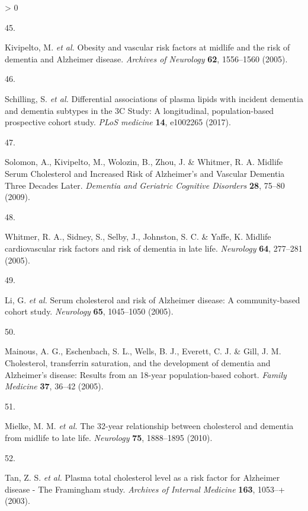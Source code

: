 \documentclass[a4paper, twoside]{templates/ociamthesis}
\newlength{\cslhangindent}
\newlength{\csllabelwidth}
\newenvironment{CSLReferences}[3] %
 {%
  \setlength{\parindent}{0pt}
  \ifodd #1 \everypar{\setlength{\hangindent}{\cslhangindent}}\ignorespaces\fi
  \ifnum #2 > 0
  \setlength{\parskip}{#2\baselineskip}
  \fi
 }%
 {}
\newcommand{\CSLLeftMargin}[1]{\parbox[t]{\maxof{\widthof{#1}}{\csllabelwidth}}{#1}}
\newcommand{\CSLRightInline}[1]{\parbox[t]{\linewidth - \csllabelwidth}{#1}}
\begin{document}
\begin{CSLReferences}{0}{0}
\leavevmode\hypertarget{ref-kivipelto2005}{}%
\CSLLeftMargin{45. }
\CSLRightInline{Kivipelto, M. \emph{et al.} Obesity and vascular risk factors at midlife and the risk of dementia and {Alzheimer} disease. \emph{Archives of Neurology} \textbf{62}, 1556--1560 (2005).}

\leavevmode\hypertarget{ref-schilling2017}{}%
\CSLLeftMargin{46. }
\CSLRightInline{Schilling, S. \emph{et al.} Differential associations of plasma lipids with incident dementia and dementia subtypes in the {3C Study}: A longitudinal, population-based prospective cohort study. \emph{PLoS medicine} \textbf{14}, e1002265 (2017).}

\leavevmode\hypertarget{ref-solomon2009}{}%
\CSLLeftMargin{47. }
\CSLRightInline{Solomon, A., Kivipelto, M., Wolozin, B., Zhou, J. \& Whitmer, R. A. Midlife {Serum Cholesterol} and {Increased Risk} of {Alzheimer}'s and {Vascular Dementia Three Decades Later}. \emph{Dementia and Geriatric Cognitive Disorders} \textbf{28}, 75--80 (2009).}

\leavevmode\hypertarget{ref-whitmer2005}{}%
\CSLLeftMargin{48. }
\CSLRightInline{Whitmer, R. A., Sidney, S., Selby, J., Johnston, S. C. \& Yaffe, K. Midlife cardiovascular risk factors and risk of dementia in late life. \emph{Neurology} \textbf{64}, 277--281 (2005).}

\leavevmode\hypertarget{ref-li2005a}{}%
\CSLLeftMargin{49. }
\CSLRightInline{Li, G. \emph{et al.} Serum cholesterol and risk of {Alzheimer} disease: A community-based cohort study. \emph{Neurology} \textbf{65}, 1045--1050 (2005).}

\leavevmode\hypertarget{ref-mainous2005}{}%
\CSLLeftMargin{50. }
\CSLRightInline{Mainous, A. G., Eschenbach, S. L., Wells, B. J., Everett, C. J. \& Gill, J. M. Cholesterol, transferrin saturation, and the development of dementia and {Alzheimer}'s disease: Results from an 18-year population-based cohort. \emph{Family Medicine} \textbf{37}, 36--42 (2005).}

\leavevmode\hypertarget{ref-mielke2010}{}%
\CSLLeftMargin{51. }
\CSLRightInline{Mielke, M. M. \emph{et al.} The 32-year relationship between cholesterol and dementia from midlife to late life. \emph{Neurology} \textbf{75}, 1888--1895 (2010).}

\leavevmode\hypertarget{ref-tan2003a}{}%
\CSLLeftMargin{52. }
\CSLRightInline{Tan, Z. S. \emph{et al.} Plasma total cholesterol level as a risk factor for {Alzheimer} disease - {The Framingham} study. \emph{Archives of Internal Medicine} \textbf{163}, 1053--+ (2003).}


\end{CSLReferences}
\end{document}
